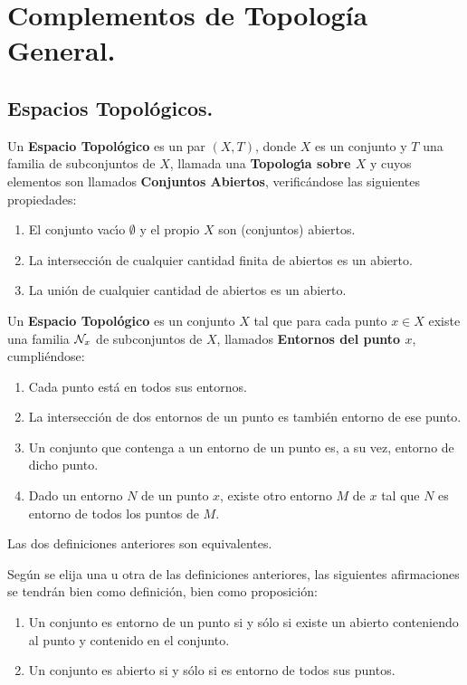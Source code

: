 \documentclass[cursovd_portada.tex]{subfiles}
\begin{document}
\chapter{Complementos de Topología\\ General.}
\section{Espacios Topol\'{o}gicos.}
\begin{defi}
Un {\bf Espacio Topol\'{o}gico} es un par $(X,T)$, donde $X$ es un conjunto y $T$ una familia de subconjuntos de $X$,
llamada una {\bf Topolog\'{\i}a sobre $X$} y cuyos elementos son llamados {\bf Conjuntos Abiertos}, verific\'{a}ndose las
siguientes propiedades:
\begin{enumerate}
\item El conjunto vac\'{\i}o $\emptyset$ y el propio $X$ son (conjuntos) abiertos.
\item La intersecci\'{o}n de cualquier cantidad finita de abiertos es un abierto.
\item La uni\'{o}n de cualquier cantidad de abiertos es un abierto.
\end{enumerate}
\end{defi}
\begin{defi}
Un {\bf Espacio Topol\'{o}gico} es un conjunto $X$ tal que para cada punto $x\in X$ existe una familia ${\cal N}_x$ de
subconjuntos de $X$, llamados {\bf Entornos del punto $x$}, cumpli\'{e}ndose:
\begin{enumerate}
\item Cada punto est\'{a} en todos sus entornos.
\item La intersecci\'{o}n de dos entornos de un punto es tambi\'{e}n entorno de ese punto.
\item Un conjunto que contenga a un entorno de un punto es, a su vez, entorno de dicho punto.
\item Dado un entorno $N$ de un punto $x$, existe otro entorno $M$ de $x$ tal que $N$ es entorno de todos los
puntos de $M$.
\end{enumerate}
\end{defi}
\begin{teorema}
Las dos definiciones anteriores son equivalentes.
\end{teorema}
\begin{nota}
{\rm Seg\'{u}n se elija una u otra de las definiciones anteriores, las siguientes afirmaciones se tendr\'{a}n bien como
definici\'{o}n, bien como proposici\'{o}n:
\begin{enumerate}
\item Un conjunto es entorno de un punto si y s\'{o}lo si existe un abierto conteniendo al punto y contenido en el
conjunto.
\item Un conjunto es abierto si y s\'{o}lo si es entorno de todos sus puntos.
\end{enumerate}}
\end{nota}
\end{document}
